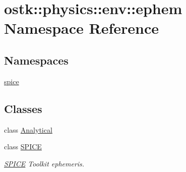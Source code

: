 \hypertarget{namespaceostk_1_1physics_1_1env_1_1ephem}{}\section{ostk\+:\+:physics\+:\+:env\+:\+:ephem Namespace Reference}
\label{namespaceostk_1_1physics_1_1env_1_1ephem}
\subsection*{Namespaces}
\begin{DoxyCompactItemize}
\item 
 \hyperlink{namespaceostk_1_1physics_1_1env_1_1ephem_1_1spice}{spice}
\end{DoxyCompactItemize}
\subsection*{Classes}
\begin{DoxyCompactItemize}
\item 
class \hyperlink{classostk_1_1physics_1_1env_1_1ephem_1_1_analytical}{Analytical}
\item 
class \hyperlink{classostk_1_1physics_1_1env_1_1ephem_1_1_s_p_i_c_e}{S\+P\+I\+CE}
\begin{DoxyCompactList}\small\item\em \hyperlink{classostk_1_1physics_1_1env_1_1ephem_1_1_s_p_i_c_e}{S\+P\+I\+CE} Toolkit ephemeris. \end{DoxyCompactList}\end{DoxyCompactItemize}
